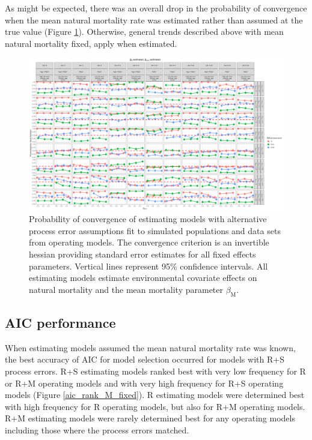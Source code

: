 \documentclass[
  12pt,
]{article}
\begin{document}
As might be expected, there was an overall drop in the probability of
convergence when the mean natural mortality rate was estimated rather
than assumed at the true value (Figure \ref{convergence_M_estimated}).
Otherwise, general trends described above with mean natural mortality
fixed, apply when estimated.

\begin{landscape}
\begin{figure}
\caption{Probability of convergence of estimating models with alternative process error assumptions fit to simulated populations and data sets from operating models. The convergence criterion is an invertible hessian providing standard error estimates for all fixed effects parameters. Vertical lines represent 95\% confidence intervals. All estimating models estimate environmental covariate effects on natural mortality and the mean mortality parameter $\beta_\text{M}$.}\label{convergence_M_estimated}
\begin{center}
\includegraphics[height = \textheight]{proportion_good_hessian_ecov_effect_est_M_est.png}
\end{center}
\end{figure}
\end{landscape}

\hypertarget{aic-performance}{%
\subsection*{AIC performance}\label{aic-performance}}

When estimating models assumed the mean natural mortality rate was
known, the best accuracy of AIC for model selection occurred for models
with R+S process errors. R+S estimating models ranked best with very low
frequency for R or R+M operating models and with very high frequency for
R+S operating models (Figure \ref{aic_rank_M_fixed}). R estimating
models were determined best with high frequency for R operating models,
but also for R+M operating models. R+M estimating models were rarely
determined best for any operating models including those where the
process errors matched.
\end{document}
